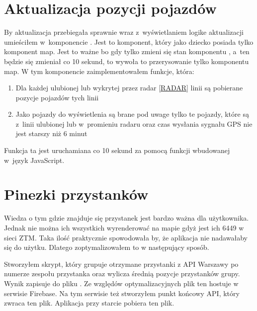 \documentclass{SGGW-thesis}
\begin{document}
\section{Aktualizacja pozycji pojazdów}
By aktualizacja przebiegała sprawnie wraz z~wyświetlaniem logike aktualizacji umieściłem w~komponencie .
Jest to komponent, który jako dziecko posiada tylko komponent map.
Jest to ważne bo gdy tylko zmieni się stan komponentu , a~ten będzie się zmieniał co 10 sekund, to wywoła to przerysowanie tylko komponentu map.
W tym komponencie zaimplementowałem funkcje, która:
\begin{enumerate}
  \item{Dla każdej ulubionej lub wykrytej przez radar \ref{RADAR} linii są pobierane pozycje pojazdów tych linii}
  \item{Jako pojazdy do wyświetlenia są brane pod uwage tylko te pojazdy, które są z~linii ulubionej lub w~promieniu radaru oraz czas wysłania sygnału GPS nie jest starszy niż 6 minut}
\end{enumerate}
Funkcja ta jest uruchamiana co 10 sekund za pomocą funkcji  wbudowanej w~język JavaScript.

\section{Pinezki przystanków}
Wiedza o tym gdzie znajduje się przystanek jest bardzo ważna dla użytkownika.
Jednak nie można ich wszystkich wyrenderować na mapie gdyż jest ich 6449 w sieci ZTM.
Taka ilość praktycznie spowodowała by, że aplikacja nie nadawałaby się do użytku.
Dlatego zoptymalizowałem to w następujący sposób.

\label{FIREBASE}
Stworzyłem skrypt, który grupuje otrzymane przystanki z API Warszawy po numerze zespołu przystanka oraz wylicza średnią pozycje przystanków grupy.
Wynik zapisuje do pliku .
Ze względów optymalizacyjnych plik ten hostuje w serwisie Firebase.
Na tym serwisie też stworzyłem punkt końcowy API, który zwraca ten plik.
Aplikacja przy starcie pobiera ten plik.
\end{document}
